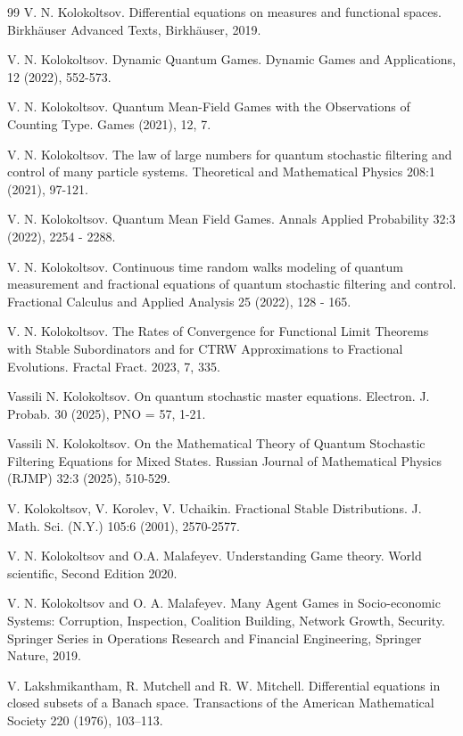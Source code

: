 \documentclass[12pt]{article}
\begin{document}
\begin{thebibliography}{99}
 V. N. Kolokoltsov. Differential equations on measures and functional spaces.
Birkh\"auser Advanced Texts, Birkh\"auser, 2019.

V. N. Kolokoltsov. Dynamic Quantum Games.
Dynamic Games and Applications, 12 (2022), 552-573.

V. N. Kolokoltsov.
Quantum Mean-Field Games with the Observations of
Counting Type.  Games (2021), 12, 7.

V. N. Kolokoltsov.
The law of large numbers for quantum stochastic filtering and control of  many particle systems.
 Theoretical and Mathematical Physics 208:1 (2021), 97-121.

V. N. Kolokoltsov. Quantum Mean Field Games.
Annals Applied Probability 32:3 (2022), 2254 - 2288.

V. N. Kolokoltsov.
Continuous time random walks modeling of quantum measurement and
fractional equations of quantum stochastic filtering and control.
Fractional Calculus and Applied Analysis 25 (2022), 128 - 165.

V. N. Kolokoltsov.
The Rates of Convergence for Functional Limit Theorems with
Stable Subordinators and for CTRW Approximations to
Fractional Evolutions. Fractal Fract. 2023, 7, 335.

Vassili N. Kolokoltsov.
On quantum stochastic master equations.
Electron. J. Probab. 30 (2025), PNO = 57, 1-21.

Vassili N. Kolokoltsov.
On the Mathematical Theory of Quantum Stochastic Filtering Equations for Mixed States.
Russian Journal of Mathematical Physics (RJMP) 32:3 (2025), 510-529.

V. Kolokoltsov, V. Korolev, V. Uchaikin.
Fractional Stable Distributions. J. Math. Sci. (N.Y.) 105:6
(2001), 2570-2577.

 V. N. Kolokoltsov and O.A. Malafeyev.
Understanding Game theory.
World scientific, Second Edition 2020.

 V. N. Kolokoltsov and O. A. Malafeyev.
Many Agent Games in Socio-economic Systems:
Corruption, Inspection, Coalition Building, Network Growth, Security.
Springer Series in Operations Research and Financial Engineering, Springer Nature, 2019.

V. Lakshmikantham, R. Mutchell and R. W. Mitchell.
Differential equations in closed subsets of a Banach space.
Transactions of the American Mathematical Society 220 (1976), 103--113.


\end{thebibliography}
\end{document}
